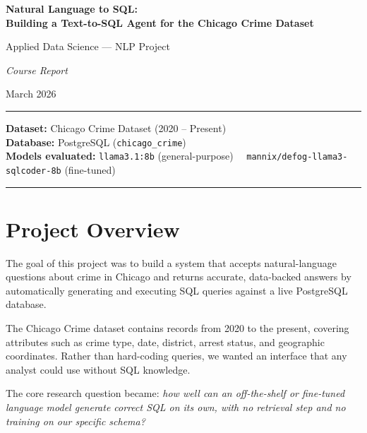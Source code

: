 \documentclass[12pt,a4paper]{article}
\begin{document}
\begin{titlepage}
    \centering
    \vspace*{2cm}
    {\LARGE\bfseries Natural Language to SQL:\\[0.4em]
    Building a Text-to-SQL Agent for the Chicago Crime Dataset\par}
    \vspace{1.5cm}
    {\large Applied Data Science --- NLP Project\par}
    \vspace{0.5cm}
    {\large\itshape Course Report\par}
    \vspace{2cm}
    {\normalsize March 2026\par}
    \vfill
    \hrule
    \vspace{0.5cm}
    {\small
    \textbf{Dataset:} Chicago Crime Dataset (2020 -- Present)\\
    \textbf{Database:} PostgreSQL (\texttt{chicago\_crime})\\
    \textbf{Models evaluated:} \texttt{llama3.1:8b} (general-purpose) \ \textbullet\
    \texttt{mannix/defog-llama3-sqlcoder-8b} (fine-tuned)
    }
    \vspace{0.5cm}
    \hrule
\end{titlepage}

\tableofcontents
\newpage

\section{Project Overview}

The goal of this project was to build a system that accepts natural-language questions
about crime in Chicago and returns accurate, data-backed answers by automatically
generating and executing SQL queries against a live PostgreSQL database.

The Chicago Crime dataset contains records from 2020 to the present, covering attributes
such as crime type, date, district, arrest status, and geographic coordinates.
Rather than hard-coding queries, we wanted an interface that any analyst could use
without SQL knowledge.

The core research question became: \textit{how well can an off-the-shelf or fine-tuned
language model generate correct SQL on its own, with no retrieval step and no training
on our specific schema?}
\end{document}
